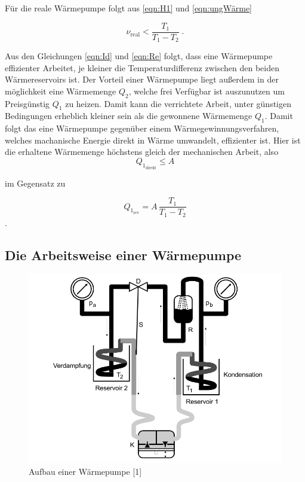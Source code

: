 Für die reale Wärmepumpe folgt aus \ref{eqn:H1} und \ref{eqn:ungWärme}

\begin{equation}
    \nu_\text{real} < \frac{T_1}{T_1 - T_2} \; \text{.}
    \label{eqn:Re}
\end{equation}

Aus den Gleichungen \ref{eqn:Id} und \ref{eqn:Re} folgt, dass eine Wärmepumpe effizienter Arbeitet, je kleiner die Temperaturdifferenz
zwischen den beiden Wärmereservoirs ist. Der Vorteil einer Wärmepumpe liegt außerdem in der möglichkeit eine Wärmemenge $Q_2$, welche frei Verfügbar ist 
auszunutzen um Preisgünstig $Q_1$ zu heizen. Damit kann die verrichtete Arbeit, unter günstigen Bedingungen erheblich kleiner sein als die gewonnene Wärmemenge $Q_1$.
Damit folgt das eine Wärmepumpe gegenüber einem Wärmegewinnungsverfahren, welches machanische Energie direkt in Wärme umwandelt, effizienter ist.
Hier ist die erhaltene Wärmemenge höchstens gleich der mechanischen Arbeit, also
\begin{equation*}
    Q_{1_\text{direkt}}\leq A
\end{equation*}

im Gegensatz zu

\begin{equation*}
    Q_{1_\text{rev}}=A\,\frac{T_1}{T_1-T_2}
\end{equation*}.
\subsection{Die Arbeitsweise einer Wärmepumpe}
\begin{figure}
    \centering
    \includegraphics[scale=0.4]{aufbau.pdf}
    \caption{Aufbau einer Wärmepumpe [1]}
    \label{fig:aufbau2}
\end{figure}